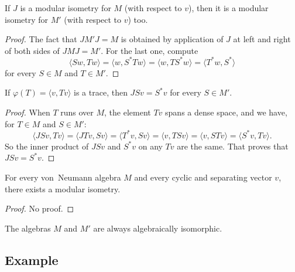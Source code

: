 \begin{proposition}
	If $J$ is a modular isometry for $M$ (with respect to $v$), then it is a modular isometry for $M'$ (with respect to $v$) too.
\end{proposition}

\begin{proof}
	The fact that $JM'J=M$ is obtained by application of $J$ at left and right of both sides of $JMJ=M'$. For the last one, compute
	\begin{equation}
		\langle Sw, Tw\rangle =\langle w, S^*Tw\rangle =\langle w, TS^*w\rangle =\langle T^*w, S^*\rangle 
	\end{equation}
	for every $S\in M$ and $T\in M'$.
\end{proof}

\begin{proposition}
If $\varphi(T)=\langle v, Tv\rangle $ is a trace, then $JSv=S^*v$ for every $S\in M'$.
\end{proposition}

\begin{proof}
When $T$ runs over $M$, the element $Tv$ spans a dense space, and we have, for $T\in M$ and $S\in M'$:
\begin{equation}
	\langle JSv, Tv\rangle =\langle JTv, Sv\rangle =\langle T^*v, Sv\rangle =\langle v, TSv\rangle =\langle v, STv\rangle =\langle S^*v, Tv\rangle .
\end{equation}
So the inner product of $JSv$ and $S^*v$ on any $Tv$ are the same. That proves that $JSv=S^*v$.
\end{proof}

\begin{theorem}
For every von~Neumann algebra $M$ and every cyclic and separating vector $v$, there exists a modular isometry.
\end{theorem}

\begin{proof}
No proof.
\end{proof}

\begin{corollary}
The algebras $M$ and $M'$ are always algebraically isomorphic.
\end{corollary}

					\subsection{Example}

